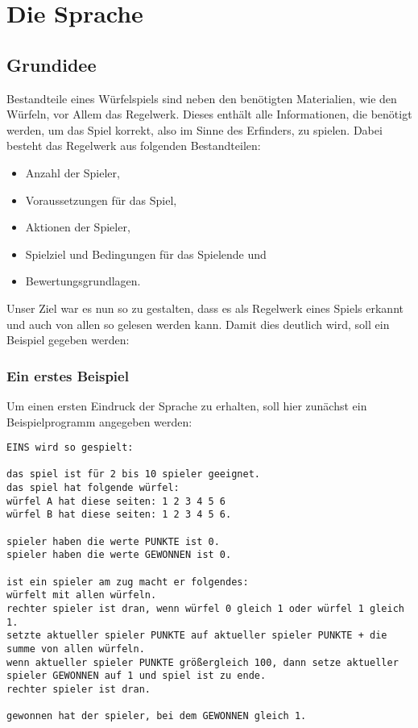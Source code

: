 
\chapter{Die Sprache}
\label{cha:die_sprache}

\section{Grundidee}
\label{sec:grundidee}
	Bestandteile eines Würfelspiels sind neben den benötigten Materialien, wie den Würfeln, vor Allem das Regelwerk. Dieses enthält alle Informationen, die benötigt werden, um das Spiel korrekt, also im Sinne des Erfinders, zu spielen. Dabei besteht das Regelwerk aus folgenden Bestandteilen:
	\begin{itemize}
		\item Anzahl der Spieler,
		\item Voraussetzungen für das Spiel,
		\item Aktionen der Spieler,
		\item Spielziel und Bedingungen für das Spielende und
		\item Bewertungsgrundlagen.
	\end{itemize}
	Unser Ziel war es nun \dg so zu gestalten, dass es als Regelwerk eines Spiels erkannt und auch von allen so gelesen werden kann. Damit dies deutlich wird, soll ein Beispiel gegeben werden:

	\subsection{Ein erstes Beispiel}
	\label{sub:ein_erstes_beispiel}
		Um einen ersten Eindruck der Sprache zu erhalten, soll hier zunächst ein Beispielprogramm angegeben werden:\\
\begin{lstlisting}
EINS wird so gespielt:

das spiel ist für 2 bis 10 spieler geeignet.
das spiel hat folgende würfel:
würfel A hat diese seiten: 1 2 3 4 5 6
würfel B hat diese seiten: 1 2 3 4 5 6.

spieler haben die werte PUNKTE ist 0.
spieler haben die werte GEWONNEN ist 0.

ist ein spieler am zug macht er folgendes:
würfelt mit allen würfeln.
rechter spieler ist dran, wenn würfel 0 gleich 1 oder würfel 1 gleich 1.
setzte aktueller spieler PUNKTE auf aktueller spieler PUNKTE + die summe von allen würfeln.
wenn aktueller spieler PUNKTE größergleich 100, dann setze aktueller spieler GEWONNEN auf 1 und spiel ist zu ende.
rechter spieler ist dran.

gewonnen hat der spieler, bei dem GEWONNEN gleich 1.
\end{lstlisting}

